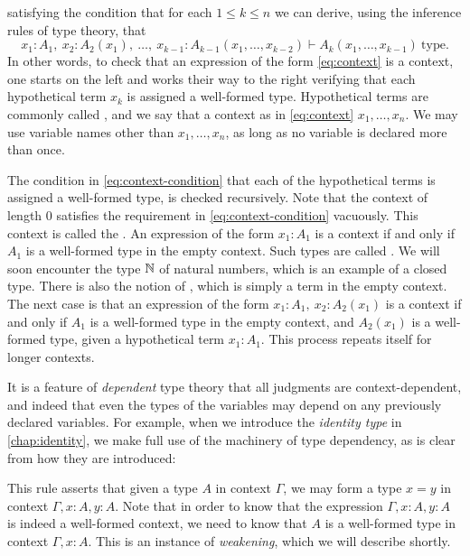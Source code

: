 satisfying the condition that for each $1\leq k\leq n$ we can derive, using the inference rules of type theory, that
\begin{equation}\label{eq:context-condition}
  x_1:A_1,~x_2:A_2(x_1),~\ldots,~x_{k-1}:A_{k-1}(x_1,\ldots,x_{k-2})\vdash A_k(x_1,\ldots,x_{k-1})~\mathrm{type}.
\end{equation}
In other words, to check that an expression of the form \cref{eq:context} is a context, one starts on the left and works their way to the right verifying that each hypothetical term $x_k$ is assigned a well-formed type. Hypothetical terms are commonly called , and we say that a context as in \cref{eq:context}  $x_1,\ldots,x_n$. We may use variable names other than $x_1,\ldots,x_n$, as long as no variable is declared more than once.

The condition in \cref{eq:context-condition} that each of the hypothetical terms is assigned a well-formed type, is checked recursively. Note that the context of length $0$ satisfies the requirement in \cref{eq:context-condition} vacuously. This context is called the . An expression of the form $x_1:A_1$ is a context if and only if $A_1$ is a well-formed type in the empty context. Such types are called . We will soon encounter the type $\N$ of natural numbers, which is an example of a closed type. There is also the notion of , which is simply a term in the empty context. The next case is that an expression of the form $x_1:A_1,~x_2:A_2(x_1)$ is a context if and only if $A_1$ is a well-formed type in the empty context, and $A_2(x_1)$ is a well-formed type, given a hypothetical term $x_1:A_1$. This process repeats itself for longer contexts.

It is a feature of \emph{dependent} type theory that all judgments are context-dependent, and indeed that even the types of the variables may depend on any previously declared variables. For example, when we introduce the \emph{identity type} in \cref{chap:identity}, we make full use of the machinery of type dependency, as is clear from how they are introduced:
\begin{prooftree}
\end{prooftree}
This rule asserts that given a type $A$ in context $\Gamma$, we may form a type $x=y$ in context $\Gamma,x:A,y:A$. Note that in order to know that the expression $\Gamma,x:A,y:A$ is indeed a well-formed context, we need to know that $A$ is a well-formed type in context $\Gamma,x:A$. This is an instance of \emph{weakening}, which we will describe shortly.

